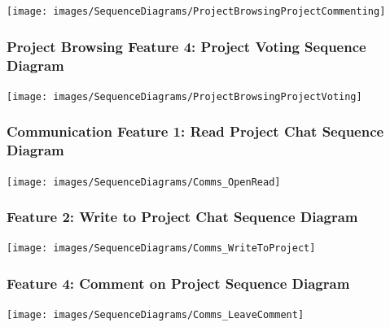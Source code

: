 \documentclass[twoside,letterpaper]{article}
\begin{document}
	\texttt{[image: images/SequenceDiagrams/ProjectBrowsingProjectCommenting]}
	
	\newpage
	
	
	\subsubsection[Project Browsing Feature 4: Project Voting Sequence Diagram]{\rmfamily\bfseries\color{black}
		Project Browsing Feature 4: Project Voting Sequence Diagram}
	\hypertarget{RefHeading22059017292}{}
	
	\bigskip
	
	\texttt{[image: images/SequenceDiagrams/ProjectBrowsingProjectVoting]}
	
	\newpage
	
	
	\subsubsection[Communication Feature 1: Read Project Chat Sequence Diagram]{\rmfamily\bfseries\color{black}
		Communication Feature 1: Read Project Chat Sequence Diagram}
	\hypertarget{RefHeading22059017292}{}
	
	\bigskip
	
	\texttt{[image: images/SequenceDiagrams/Comms\_OpenRead]}
	
	\newpage
	
	\subsubsection[Communication Feature 2: Write to Project Chat Sequence Diagram]{\rmfamily\bfseries\color{black}
		Feature 2: Write to Project Chat Sequence Diagram}
	\hypertarget{RefHeading22059017292}{}
	
	\bigskip
	
	\texttt{[image: images/SequenceDiagrams/Comms\_WriteToProject]}
	
	\newpage
	
	
	\subsubsection[Communication Feature 4: Comment on Project Sequence Diagram]{\rmfamily\bfseries\color{black}
		Feature 4: Comment on Project Sequence Diagram}
	\hypertarget{RefHeading22059017292}{}
	
	\bigskip
	
	\texttt{[image: images/SequenceDiagrams/Comms\_LeaveComment]}
	
\end{document}
